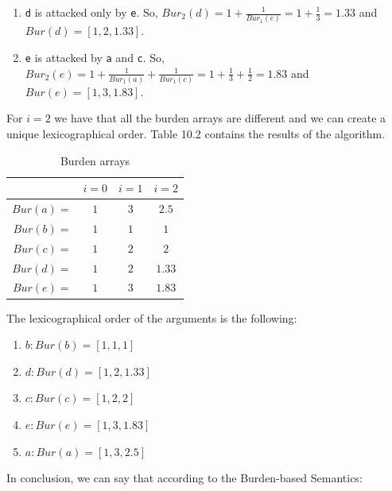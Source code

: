 \documentclass{scrbook}
\begin{document}
\begin{enumerate}
\begin{enumerate}[label=\alph*)]
        \item 
        \texttt{d} is attacked only by \texttt{e}. So, $Bur_2(d) = 1 + \frac{1}{Bur_1(e)} = 1 + \frac{1}{3} = 1.33$ and $Bur(d) = [1,2,1.33]$.

        \item 
        \texttt{e} is attacked by \texttt{a} and \texttt{c}. So, $Bur_2(e) = 1 + \frac{1}{Bur_1(a)} + \frac{1}{Bur_1(c)} = 1 + \frac{1}{3} + \frac{1}{2} = 1.83$ and $Bur(e) = [1,3,1.83]$.
    \end{enumerate}

    For $i=2$ we have that all the burden arrays are different and we can create a unique lexicographical order. Table 10.2 contains the results of the algorithm.
\end{enumerate}

\begin{table}[]
    \centering
    \begin{tabular}{|r|c|c|c|} \hline
         &  $i=0$ & $i=1$ & $i=2$ \\ \hline

        $Bur(a)=$ & $1$ & $3$ & $2.5$ \\ \hline
        $Bur(b)=$ & $1$ & $1$ & $1$ \\ \hline
        $Bur(c)=$ & $1$ & $2$ & $2$ \\ \hline
        $Bur(d)=$ & $1$ & $2$ & $1.33$ \\ \hline
        $Bur(e)=$ & $1$ & $3$ & $1.83$ \\ \hline
    \end{tabular}
    \caption{Burden arrays}
\end{table}

The lexicographical order of the arguments is the following:

\begin{enumerate}
    \item 
    $b: Bur(b)=[1,1,1]$

    \item 
    $d: Bur(d)=[1,2,1.33]$

    \item 
    $c: Bur(c)=[1,2,2]$

    \item 
    $e: Bur(e)=[1,3,1.83]$

    \item 
    $a: Bur(a)=[1,3,2.5]$
\end{enumerate}

In conclusion, we can say that according to the Burden-based Semantics: \\
\end{document}
